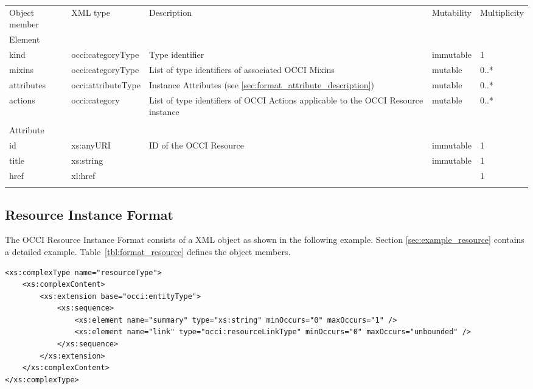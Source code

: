 \documentclass[10pt,a4paper]{article}
\begin{document}
\mytablefloat{
    \label{tbl:format_entity}
    } {
    \begin{tabularx}{\textwidth}{llXll}
    \toprule
    Object member & XML type & Description & Mutability & Multiplicity \\
    \colrule
    Element \\
    kind & occi:categoryType & Type identifier & immutable & 1 \\

    mixins & occi:categoryType & List of type identifiers of associated OCCI
Mixins  &
mutable & 0..* \\

    attributes & occi:attributeType & Instance Attributes (see
\ref{sec:format_attribute_description}) & mutable & 0..* \\
    
    actions & occi:category & List of type identifiers of OCCI
Actions applicable to the OCCI Resource instance & mutable & 0..* \\
    \\
    
    Attribute\\
    id & xs:anyURI & ID of the OCCI Resource & immutable & 1\\

    title & xs:string &  & immutable & 1\\
            
    href & xl:href & & & 1\\
    \botrule
    \end{tabularx}
}
\FloatBarrier

\subsection{Resource Instance Format}
\label{sec:format_resource}

The OCCI Resource Instance Format consists of a XML object as shown in the
following example. Section \ref{sec:example_resource} contains a detailed
example.
Table~\ref{tbl:format_resource} defines the object members.

\begin{lstlisting}
<xs:complexType name="resourceType">
	<xs:complexContent>
		<xs:extension base="occi:entityType">
			<xs:sequence>
				<xs:element name="summary" type="xs:string" minOccurs="0" maxOccurs="1" />
				<xs:element name="link" type="occi:resourceLinkType" minOccurs="0" maxOccurs="unbounded" />
			</xs:sequence>
		</xs:extension>
	</xs:complexContent>
</xs:complexType>
\end{lstlisting}
\end{document}
